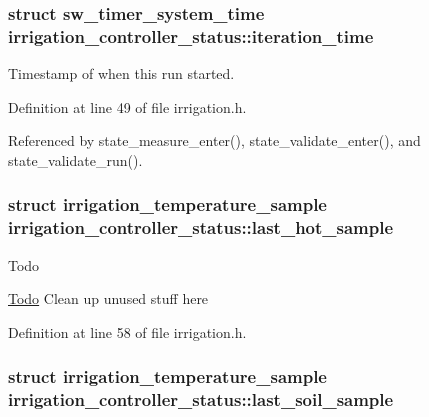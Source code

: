 \subsubsection[{iteration\+\_\+time}]{\setlength{\rightskip}{0pt plus 5cm}struct {\bf sw\+\_\+timer\+\_\+system\+\_\+time} irrigation\+\_\+controller\+\_\+status\+::iteration\+\_\+time}\label{structirrigation__controller__status_a1ae5ffb12725754d8309452cf24a2a28}


Timestamp of when this run started. 



Definition at line 49 of file irrigation.\+h.



Referenced by state\+\_\+measure\+\_\+enter(), state\+\_\+validate\+\_\+enter(), and state\+\_\+validate\+\_\+run().

\hypertarget{structirrigation__controller__status_ab795e232c4e2d405b11e24312a6163c3}{}
\subsubsection[{last\+\_\+hot\+\_\+sample}]{\setlength{\rightskip}{0pt plus 5cm}struct {\bf irrigation\+\_\+temperature\+\_\+sample} irrigation\+\_\+controller\+\_\+status\+::last\+\_\+hot\+\_\+sample}\label{structirrigation__controller__status_ab795e232c4e2d405b11e24312a6163c3}
\begin{DoxyRefDesc}{Todo}
\item[\hyperlink{todo__todo000004}{Todo}]Clean up unused stuff here \end{DoxyRefDesc}


Definition at line 58 of file irrigation.\+h.

\hypertarget{structirrigation__controller__status_a2d3ef640dc3ec8ce2789fffb092d8f80}{}
\subsubsection[{last\+\_\+soil\+\_\+sample}]{\setlength{\rightskip}{0pt plus 5cm}struct {\bf irrigation\+\_\+temperature\+\_\+sample} irrigation\+\_\+controller\+\_\+status\+::last\+\_\+soil\+\_\+sample}\label{structirrigation__controller__status_a2d3ef640dc3ec8ce2789fffb092d8f80}


